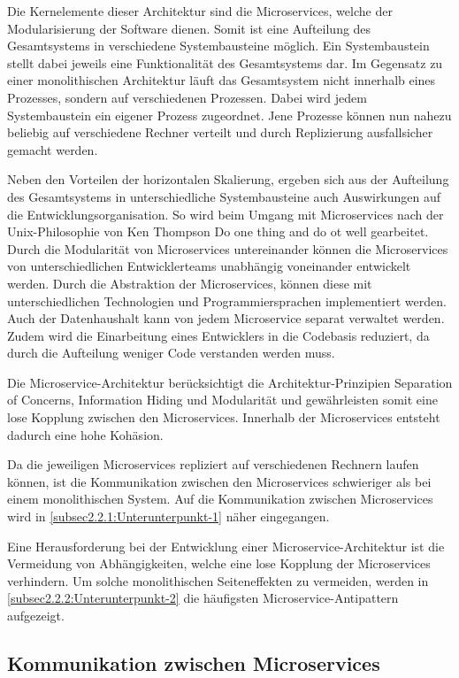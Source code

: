 Die Kernelemente dieser Architektur sind die Microservices, welche der Modularisierung der Software dienen. Somit ist eine Aufteilung des Gesamtsystems in verschiedene Systembausteine möglich. Ein Systembaustein stellt dabei jeweils eine Funktionalität des Gesamtsystems dar. Im Gegensatz zu einer monolithischen Architektur läuft das Gesamtsystem nicht innerhalb eines Prozesses, sondern auf verschiedenen Prozessen. Dabei wird jedem Systembaustein ein eigener Prozess zugeordnet. Jene Prozesse können nun nahezu beliebig auf verschiedene Rechner verteilt und durch Replizierung ausfallsicher gemacht werden. \cite{GaryCalcott.2018}

Neben den Vorteilen der horizontalen Skalierung, ergeben sich aus der Aufteilung des Gesamtsystems in unterschiedliche Systembausteine auch Auswirkungen auf die Entwicklungsorganisation. So wird beim Umgang mit Microservices nach der Unix-Philosophie von Ken Thompson \glqq Do one thing and do ot well\grqq{} \cite{IONOSSE.2021} gearbeitet. Durch die Modularität von Microservices untereinander können die Microservices von unterschiedlichen Entwicklerteams unabhängig voneinander entwickelt werden. Durch die Abstraktion der Microservices, können diese mit unterschiedlichen Technologien und Programmiersprachen implementiert werden. Auch der Datenhaushalt kann von jedem Microservice separat verwaltet werden. Zudem wird die Einarbeitung eines Entwicklers in die Codebasis reduziert, da durch die Aufteilung weniger Code verstanden werden muss.

Die Microservice-Architektur berücksichtigt die Architektur-Prinzipien Separation of Concerns, Information Hiding und Modularität und gewährleisten somit eine lose Kopplung zwischen den Microservices. Innerhalb der Microservices entsteht dadurch eine hohe Kohäsion.

Da die jeweiligen Microservices repliziert auf verschiedenen Rechnern laufen können, ist die Kommunikation zwischen den Microservices schwieriger als bei einem monolithischen System. Auf die Kommunikation zwischen Microservices wird in \autoref{subsec2.2.1:Unterunterpunkt-1} näher eingegangen.

Eine Herausforderung bei der Entwicklung einer Microservice-Architektur ist die Vermeidung von Abhängigkeiten, welche eine lose Kopplung der Microservices verhindern. Um solche monolithischen Seiteneffekten zu vermeiden, werden in \autoref{subsec2.2.2:Unterunterpunkt-2} die häufigsten Microservice-Antipattern aufgezeigt.

\subsection{Kommunikation zwischen Microservices\label{subsec2.2.1:Unterunterpunkt-1}}

